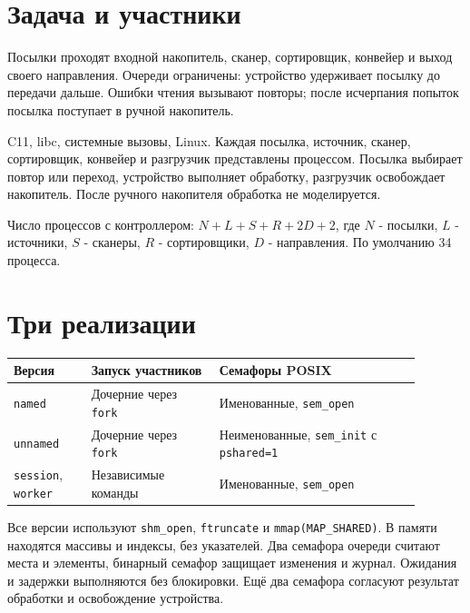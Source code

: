 \section{Задача и участники}
\begin{definition}
Посылки проходят входной накопитель, сканер, сортировщик, конвейер и выход своего направления. Очереди ограничены: устройство удерживает посылку до передачи дальше. Ошибки чтения вызывают повторы; после исчерпания попыток посылка поступает в ручной накопитель.
\end{definition}

C11, libc, системные вызовы, Linux. Каждая посылка, источник, сканер, сортировщик, конвейер и разгрузчик представлены процессом. Посылка выбирает повтор или переход, устройство выполняет обработку, разгрузчик освобождает накопитель. После ручного накопителя обработка не моделируется.

Число процессов с контроллером: $N+L+S+R+2D+2$, где $N$ - посылки, $L$ - источники, $S$ - сканеры, $R$ - сортировщики, $D$ - направления. По умолчанию 34 процесса.

\section{Три реализации}
\begin{center}
\begin{tabular}{>{\raggedright\arraybackslash}p{0.17\linewidth}>{\raggedright\arraybackslash}p{0.28\linewidth}>{\raggedright\arraybackslash}p{0.44\linewidth}}
\toprule
Версия & Запуск участников & Семафоры POSIX \\
\midrule
\texttt{named} & Дочерние через \texttt{fork} & Именованные, \texttt{sem\_open} \\
\texttt{unnamed} & Дочерние через \texttt{fork} & Неименованные, \texttt{sem\_init} с \texttt{pshared=1} \\
\texttt{session}, \texttt{worker} & Независимые команды & Именованные, \texttt{sem\_open} \\
\bottomrule
\end{tabular}
\end{center}

\begin{remark}
Все версии используют \texttt{shm\_open}, \texttt{ftruncate} и \texttt{mmap(MAP\_SHARED)}. В памяти находятся массивы и индексы, без указателей. Два семафора очереди считают места и элементы, бинарный семафор защищает изменения и журнал. Ожидания и задержки выполняются без блокировки. Ещё два семафора согласуют результат обработки и освобождение устройства.
\end{remark}

